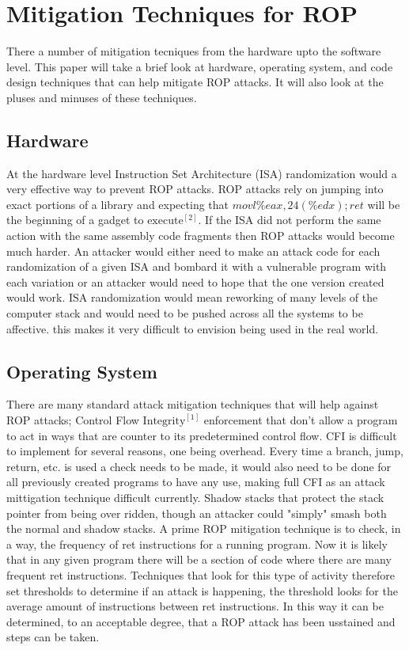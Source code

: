 \documentclass[11pt]{amsart}
\begin{document}
\section*{Mitigation Techniques for ROP}
There a number of mitigation tecniques from the hardware upto the software level. This paper will take a brief look at hardware, operating system, and code design techniques that can help mitigate ROP attacks. It will also look at the pluses and minuses of these techniques.
\subsection*{Hardware}
At the hardware level Instruction Set Architecture (ISA) randomization would a very effective way to prevent ROP attacks. ROP attacks rely on jumping into exact portions of a library and expecting that $movl \%eax, 24(\%edx); ret$ will be the beginning of a gadget to $\text{execute}^{[2]}$. If the ISA did not perform the same action with the same assembly code fragments then ROP attacks would become much harder. An attacker would either need to make an attack code for each randomization of a given ISA and bombard it with a vulnerable program with each variation or an attacker would need to hope that the one version created would work. ISA randomization would mean reworking of many levels of the computer stack and would need to be pushed across all the systems to be affective. this makes it very difficult to envision being used in the real world.
\subsection*{Operating System}
There are many standard attack mitigation techniques that will help against ROP attacks; Control Flow $\text{Integrity}^{[1]}$ enforcement that don't allow a program to act in ways that are counter to its predetermined control flow. CFI is difficult to implement for several reasons, one being overhead. Every time a branch, jump, return, etc. is used a check needs to be made, it would also need to be done for all previously created programs to have any use, making full CFI as an attack mittigation technique difficult currently. Shadow stacks that protect the stack pointer from being over ridden, though an attacker could "simply" smash both the normal and shadow stacks. \newline \newline
A prime ROP mitigation technique is to check, in a way, the frequency of ret instructions for a running program. Now it is likely that in any given program there will be a section of code where there are many frequent ret instructions. Techniques that look for this type of activity therefore set thresholds to determine if an attack is happening, the threshold looks for the average amount of instructions between ret instructions. In this way it can be determined, to an acceptable degree, that a ROP attack has been usstained and steps can be taken.
\end{document}
